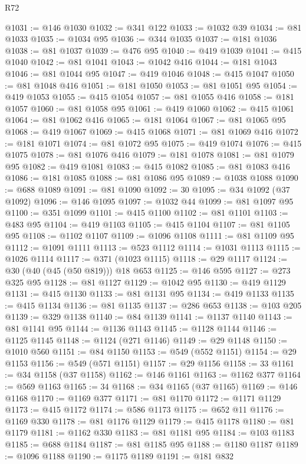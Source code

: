 \begin{lexlean}{R72}
\begin{coremodule}
@1031 := @146 @1030
@1032 := @341 @122
@1033 := @1032 @39
@1034 := @81 @1033
@1035 := @1034 @95
@1036 := @344 @1035
@1037 := @181 @1036
@1038 := @81 @1037
@1039 := @476 @95
@1040 := @419 @1039
@1041 := @415 @1040
@1042 := @81 @1041
@1043 := @1042 @416
@1044 := @181 @1043
@1046 := @81 @1044 @95
@1047 := @419 @1046
@1048 := @415 @1047
@1050 := @81 @1048 @416
@1051 := @181 @1050
@1053 := @81 @1051 @95
@1054 := @419 @1053
@1055 := @415 @1054
@1057 := @81 @1055 @416
@1058 := @181 @1057
@1060 := @81 @1058 @95
@1061 := @419 @1060
@1062 := @415 @1061
@1064 := @81 @1062 @416
@1065 := @181 @1064
@1067 := @81 @1065 @95
@1068 := @419 @1067
@1069 := @415 @1068
@1071 := @81 @1069 @416
@1072 := @181 @1071
@1074 := @81 @1072 @95
@1075 := @419 @1074
@1076 := @415 @1075
@1078 := @81 @1076 @416
@1079 := @181 @1078
@1081 := @81 @1079 @95
@1082 := @419 @1081
@1083 := @415 @1082
@1085 := @81 @1083 @416
@1086 := @181 @1085
@1088 := @81 @1086 @95
@1089 := @1038 @1088
@1090 := @688 @1089
@1091 := @81 @1090
@1092 := 30
@1095 := @34 @1092 (@37 @1092)
@1096 := @146 @1095
@1097 := @1032 @44
@1099 := @81 @1097 @95
@1100 := @351 @1099
@1101 := @415 @1100
@1102 := @81 @1101
@1103 := @483 @95
@1104 := @419 @1103
@1105 := @415 @1104
@1107 := @81 @1105 @95
@1108 := @1102 @1107
@1109 := @1096 @1108
@1111 := @81 @1109 @95
@1112 := @1091 @1111
@1113 := @523 @1112
@1114 := @1031 @1113
@1115 := @1026 @1114
@1117 := @371 (@1023 @1115)
@1118 := @29 @1117
@1124 := @30 (@40 (@45 (@50 @819))) @18 @653
@1125 := @146 @595
@1127 := @273 @325 @95
@1128 := @81 @1127
@1129 := @1042 @95
@1130 := @419 @1129
@1131 := @415 @1130
@1133 := @81 @1131 @95
@1134 := @419 @1133
@1135 := @415 @1134
@1136 := @81 @1135
@1137 := @286 @653
@1138 := @103 @205
@1139 := @329 @1138
@1140 := @84 @1139
@1141 := @1137 @1140
@1143 := @81 @1141 @95
@1144 := @1136 @1143
@1145 := @1128 @1144
@1146 := @1125 @1145
@1148 := @1124 (@271 @1146)
@1149 := @29 @1148
@1150 := @1010 @560
@1151 := @84 @1150
@1153 := @549 (@552 @1151)
@1154 := @29 @1153
@1156 := @549 (@571 @1151)
@1157 := @29 @1156
@1158 := 33
@1161 := @34 @1158 (@37 @1158)
@1162 := @146 @1161
@1163 := @1162 @377
@1164 := @569 @1163
@1165 := 34
@1168 := @34 @1165 (@37 @1165)
@1169 := @146 @1168
@1170 := @1169 @377
@1171 := @81 @1170
@1172 := @1171 @1129
@1173 := @415 @1172
@1174 := @586 @1173
@1175 := @652 @11
@1176 := @1169 @330
@1178 := @81 @1176 @1129
@1179 := @415 @1178
@1180 := @81 @1179
@1181 := @1162 @330
@1183 := @81 @1181 @95
@1184 := @103 @1183
@1185 := @688 @1184
@1187 := @81 @1185 @95
@1188 := @1180 @1187
@1189 := @1096 @1188
@1190 := @1175 @1189
@1191 := @181 @832

\end{coremodule}
\end{lexlean}
